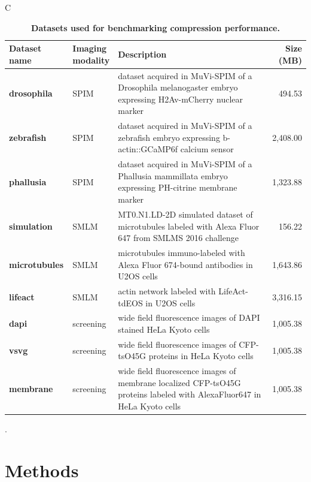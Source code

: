 \documentclass{diploma_style}
\begin{document}
\begin{table}[tbp]
\begin{small}
\renewcommand{\arraystretch}{2}C
\centering
\begin{tabular}{llp{7cm}r}
	\textbf{Dataset name} & \parbox[c]{2cm}{\textbf{Imaging\\modality}} & \textbf{Description} & \textbf{Size (MB)} \\
	\hline
	\hline
	\textbf{drosophila} & SPIM & dataset acquired in MuVi-SPIM of a Drosophila melanogaster embryo expressing H2Av-mCherry nuclear marker & 494.53 \\ \hline
	\textbf{zebrafish} & SPIM & dataset acquired in MuVi-SPIM of a zebrafish embryo expressing b-actin::GCaMP6f calcium sensor & 2,408.00 \\ \hline
	\textbf{phallusia} & SPIM & dataset acquired in MuVi-SPIM of a Phallusia mammillata embryo expressing PH-citrine membrane marker & 1,323.88  \\ \hline
	\textbf{simulation} & SMLM & MT0.N1.LD-2D simulated dataset of microtubules labeled with Alexa Fluor 647 from SMLMS 2016 challenge & 156.22 \\ \hline
	\textbf{microtubules} & SMLM & microtubules immuno-labeled with Alexa Fluor 674-bound antibodies in U2OS cells & 1,643.86  \\ \hline
	\textbf{lifeact} & SMLM & actin network labeled with LifeAct-tdEOS in U2OS cells & 3,316.15  \\ \hline
	\textbf{dapi} & screening & wide field fluorescence images of DAPI stained HeLa Kyoto cells \cite{simpson_genome-wide_2012} & 1,005.38 \\ \hline
	\textbf{vsvg} & screening & wide field fluorescence images of CFP-tsO45G proteins in HeLa Kyoto cells \cite{simpson_genome-wide_2012} & 1,005.38  \\ \hline
	\textbf{membrane} & screening & wide field fluorescence images of membrane localized CFP-tsO45G proteins labeled with AlexaFluor647 in HeLa Kyoto cells \cite{simpson_genome-wide_2012} & 1,005.38  \\ 
\end{tabular}
\caption{\textbf{Datasets used for benchmarking compression performance.}}.
\label{tab:datasets}
\end{small}
\end{table}

\section{Methods}
\end{document}
